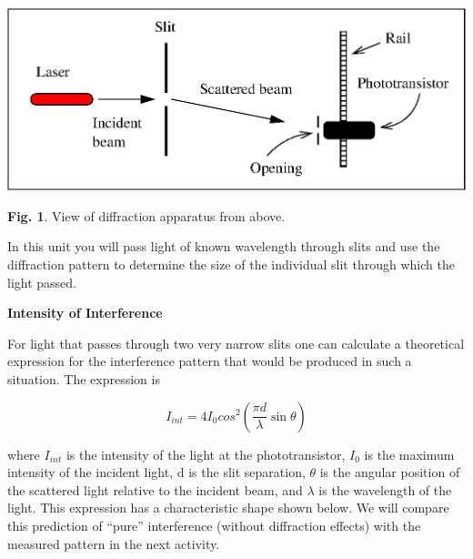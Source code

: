 \vspace{0.3cm}
\begin{center}
\includegraphics{diffraction/diffraction_of_light_fig1.eps}
\end{center}
\vspace{0.3cm}

{\centering \textbf{Fig. 1}. View of diffraction apparatus from above.\par}

In this unit you will  pass light of known wavelength through slits 
and use the diffraction pattern to determine the size of the individual
slit through which the light passed.

\newpage

\textbf{Intensity of Interference }

For light that passes through two very narrow slits one can calculate
a theoretical expression for the interference pattern that would be
produced in such a situation. The expression is 

\begin{equation} I_{int} = 4I_0 cos^2 \left (\frac {\pi d} {\lambda} \sin \theta \right ) \end{equation}

where $I_{int}$ is the intensity of the light at the phototransistor,
$I_{0}$ is the maximum intensity of the incident light, d is
the slit separation, \( \theta  \) is the angular position of the
scattered light relative to the incident beam, and \( \lambda  \)
is the wavelength of the light. This expression has a characteristic
shape shown below. We will compare this prediction of {}``pure''
interference (without diffraction effects) with the measured pattern
in the next activity.

